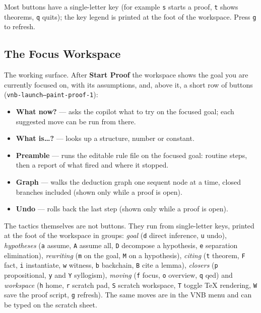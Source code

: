 \noindent
Most buttons have a single-letter key (for example \texttt{s} starts a proof,
\texttt{t} shows theorems, \texttt{q} quits); the key legend is printed at the
foot of the workspace.  Press \texttt{g} to refresh.

\subsection{The Focus Workspace}

The working surface.  After \textbf{Start Proof} the workspace shows
the goal you are currently focused on, with its assumptions, and, above it, a
short row of buttons (\texttt{vnb-launch--paint-proof-1}):

\begin{itemize}
\item \textbf{What now?} --- asks the copilot what to try on the focused
  goal; each suggested move can be run from there.
\item \textbf{What is\ldots?} --- looks up a structure, number or constant.
\item \textbf{Preamble} --- runs the editable rule file on the focused goal:
  routine steps, then a report of what fired and where it stopped.
\item \textbf{Graph} --- walks the deduction graph one sequent node at a
  time, closed branches included (shown only while a proof is open).
\item \textbf{Undo} --- rolls back the last step (shown only while a proof
  is open).
\end{itemize}

\noindent
The tactics themselves are not buttons.  They run from single-letter keys,
printed at the foot of the workspace in groups: \emph{goal} (\texttt{d} direct
inference, \texttt{u} undo), \emph{hypotheses} (\texttt{a} assume,
\texttt{A} assume all, \texttt{D} decompose a hypothesis, \texttt{e}
separation elimination), \emph{rewriting} (\texttt{m} on the goal,
\texttt{M} on a hypothesis), \emph{citing} (\texttt{t} theorem, \texttt{F}
fact, \texttt{i} instantiate, \texttt{w} witness, \texttt{b} backchain,
\texttt{B} cite a lemma), \emph{closers} (\texttt{p} propositional, \texttt{y}
and \texttt{Y} syllogism), \emph{moving} (\texttt{f} focus, \texttt{o} overview,
\texttt{q} qed) and \emph{workspace} (\texttt{h} home, \texttt{r} scratch pad,
\texttt{S} scratch workspace, \texttt{T} toggle TeX rendering, \texttt{W} save
the proof script, \texttt{g} refresh).  The same moves are in the VNB menu and
can be typed on the scratch sheet.


